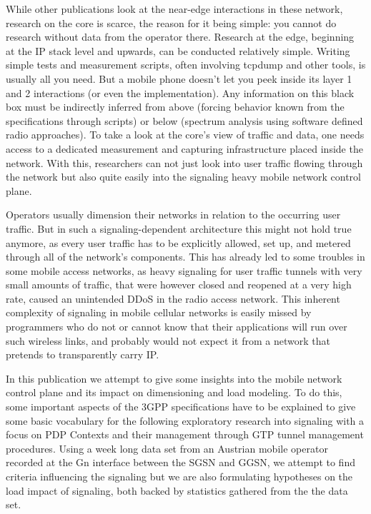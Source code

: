 While other publications look at the near-edge interactions in these network, research on the core is scarce, the reason for it being simple: you cannot do research without data from the operator there. Research at the edge, beginning at the IP stack level and upwards, can be conducted relatively simple. Writing simple tests and measurement scripts, often involving tcpdump and other tools, is usually all you need. But a mobile phone doesn't let you peek inside its layer 1 and 2 interactions (or even the implementation). Any information on this black box must be indirectly inferred from above (forcing behavior known from the specifications through scripts) or below (spectrum analysis using software defined radio approaches). To take a look at the core's view of traffic and data, one needs access to a dedicated measurement and capturing infrastructure placed inside the network. With this, researchers can not just look into user traffic flowing through the network but also quite easily into the signaling heavy mobile network control plane. 

Operators usually dimension their networks in relation to the occurring user traffic. But in such a signaling-dependent architecture this might not hold true anymore, as every user traffic has to be explicitly allowed, set up, and metered through all of the network's components. This has already led to some troubles in some mobile access networks, as heavy signaling for user traffic tunnels with very small amounts of traffic, that were however closed and reopened at a very high rate, caused an unintended \ac{DDoS} in the radio access network\cite{lt2012docostorm, it2011birdandroid}. 
This inherent complexity of signaling in mobile cellular networks is easily missed by programmers who do not or cannot know that their applications will run over such wireless links, and probably would not expect it from a network that pretends to transparently carry IP.

In this publication we attempt to give some insights into the mobile network control plane and its impact on dimensioning and load modeling. To do this, some important aspects of the \ac{3GPP} specifications have to be explained to give some basic vocabulary for the following exploratory research into signaling with a focus on \ac{PDP} Contexts and their management through \ac{GTP} tunnel management procedures. Using a week long data set from an Austrian mobile operator recorded at the Gn interface between the \ac{SGSN} and \ac{GGSN}, we attempt to find criteria influencing the signaling but we are also formulating hypotheses on the load impact of signaling, both backed by statistics gathered from the the data set.\\

